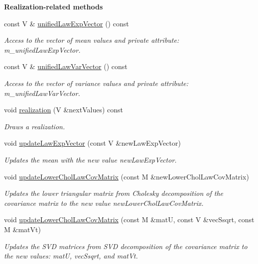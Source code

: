 \begin{Indent}{\bf Realization-\/related methods}\par
\begin{DoxyCompactItemize}
\item 
const V \& \hyperlink{class_q_u_e_s_o_1_1_gaussian_vector_realizer_aed5160b9059056ed699a43d02b52718f}{unified\-Law\-Exp\-Vector} () const 
\begin{DoxyCompactList}\small\item\em Access to the vector of mean values and private attribute\-: m\-\_\-unified\-Law\-Exp\-Vector. \end{DoxyCompactList}\item 
const V \& \hyperlink{class_q_u_e_s_o_1_1_gaussian_vector_realizer_a4e42eda8fa9a5f23eb2cb6963df4eddc}{unified\-Law\-Var\-Vector} () const 
\begin{DoxyCompactList}\small\item\em Access to the vector of variance values and private attribute\-: m\-\_\-unified\-Law\-Var\-Vector. \end{DoxyCompactList}\item 
void \hyperlink{class_q_u_e_s_o_1_1_gaussian_vector_realizer_ad001b06fe7dab455507df0eb19494518}{realization} (V \&next\-Values) const 
\begin{DoxyCompactList}\small\item\em Draws a realization. \end{DoxyCompactList}\item 
void \hyperlink{class_q_u_e_s_o_1_1_gaussian_vector_realizer_a04b1533c8f182d0705e5bb3309f3bb74}{update\-Law\-Exp\-Vector} (const V \&new\-Law\-Exp\-Vector)
\begin{DoxyCompactList}\small\item\em Updates the mean with the new value {\ttfamily new\-Law\-Exp\-Vector}. \end{DoxyCompactList}\item 
void \hyperlink{class_q_u_e_s_o_1_1_gaussian_vector_realizer_a560a5c29ea7dfe62c55615e0c619711b}{update\-Lower\-Chol\-Law\-Cov\-Matrix} (const M \&new\-Lower\-Chol\-Law\-Cov\-Matrix)
\begin{DoxyCompactList}\small\item\em Updates the lower triangular matrix from Cholesky decomposition of the covariance matrix to the new value {\ttfamily new\-Lower\-Chol\-Law\-Cov\-Matrix}. \end{DoxyCompactList}\item 
void \hyperlink{class_q_u_e_s_o_1_1_gaussian_vector_realizer_aa3605290dd302f4444881796c303bb42}{update\-Lower\-Chol\-Law\-Cov\-Matrix} (const M \&mat\-U, const V \&vec\-Ssqrt, const M \&mat\-Vt)
\begin{DoxyCompactList}\small\item\em Updates the S\-V\-D matrices from S\-V\-D decomposition of the covariance matrix to the new values\-: {\ttfamily mat\-U}, {\ttfamily vec\-Ssqrt}, and {\ttfamily mat\-Vt}. \end{DoxyCompactList}\end{DoxyCompactItemize}
\end{Indent}

